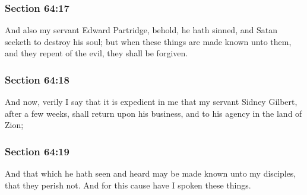 	\subsubsection{Section 64:17} %
		\label{DC64-17}

		And also my servant Edward Partridge, behold, he hath sinned, and Satan seeketh to destroy his soul; but when these things are made known unto them, and they repent of the evil, they shall be forgiven.


	\subsubsection{Section 64:18} %
		\label{DC64-18}

		And now, verily I say that it is expedient in me that my servant Sidney Gilbert, after a few weeks, shall return upon his business, and to his agency in the land of Zion;


	\subsubsection{Section 64:19} %
		\label{DC64-19}

		And that which he hath seen and heard may be made known unto my disciples, that they perish not.  And for this cause have I spoken these things.


